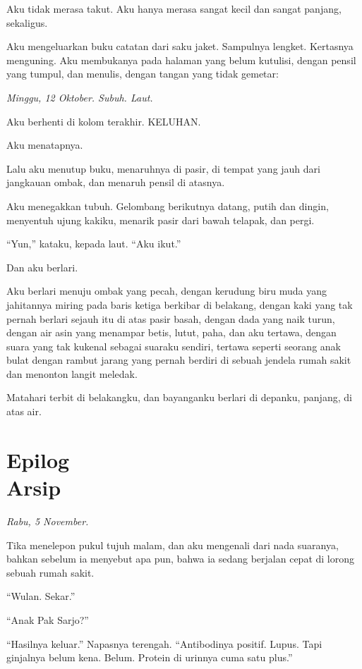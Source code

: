 \documentclass[11pt,twoside,openany]{book}
\begin{document}
Aku tidak merasa takut. Aku hanya merasa sangat kecil dan sangat panjang, sekaligus.

Aku mengeluarkan buku catatan dari saku jaket. Sampulnya lengket. Kertasnya menguning. Aku membukanya pada halaman yang belum kutulisi, dengan pensil yang tumpul, dan menulis, dengan tangan yang tidak gemetar:

\emph{Minggu, 12 Oktober. Subuh. Laut.}

Aku berhenti di kolom terakhir. KELUHAN.

Aku menatapnya.

Lalu aku menutup buku, menaruhnya di pasir, di tempat yang jauh dari jangkauan ombak, dan menaruh pensil di atasnya.

Aku menegakkan tubuh. Gelombang berikutnya datang, putih dan dingin, menyentuh ujung kakiku, menarik pasir dari bawah telapak, dan pergi.

``Yun,'' kataku, kepada laut. ``Aku ikut.''

Dan aku berlari.

Aku berlari menuju ombak yang pecah, dengan kerudung biru muda yang jahitannya miring pada baris ketiga berkibar di belakang, dengan kaki yang tak pernah berlari sejauh itu di atas pasir basah, dengan dada yang naik turun, dengan air asin yang menampar betis, lutut, paha, dan aku tertawa, dengan suara yang tak kukenal sebagai suaraku sendiri, tertawa seperti seorang anak bulat dengan rambut jarang yang pernah berdiri di sebuah jendela rumah sakit dan menonton langit meledak.

Matahari terbit di belakangku, dan bayanganku berlari di depanku, panjang, di atas air.

\chapter*{Epilog\\[0.5em]\normalsize\upshape Arsip}
\emph{Rabu, 5 November.}

Tika menelepon pukul tujuh malam, dan aku mengenali dari nada suaranya, bahkan sebelum ia menyebut apa pun, bahwa ia sedang berjalan cepat di lorong sebuah rumah sakit.

``Wulan. Sekar.''

``Anak Pak Sarjo?''

``Hasilnya keluar.'' Napasnya terengah. ``Antibodinya positif. Lupus. Tapi ginjalnya belum kena. Belum. Protein di urinnya cuma satu plus.''
\end{document}
